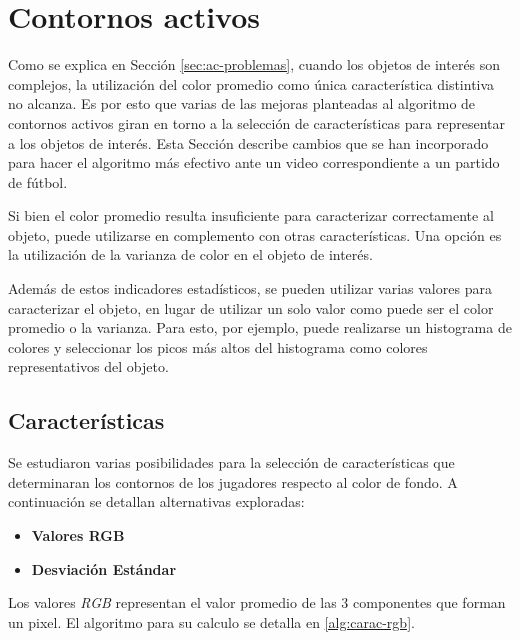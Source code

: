 \section{Contornos activos}
\label{sec:ac-extension}

Como se explica en Sección \ref{sec:ac-problemas}, cuando los objetos de
interés son complejos, la utilización del color promedio como única
característica distintiva no alcanza. Es por esto que varias de las mejoras
planteadas al algoritmo de contornos activos giran en torno a la selección de
características para representar a los objetos de interés. Esta Sección
describe cambios que se han incorporado para hacer el algoritmo más efectivo
ante un video correspondiente a un partido de fútbol.

Si bien el color promedio resulta insuficiente para caracterizar correctamente
al objeto, puede utilizarse en complemento con otras características. Una opción
es la utilización de la varianza de color en el objeto de interés.

Además de estos indicadores estadísticos, se pueden utilizar varias valores
para caracterizar el objeto, en lugar de utilizar un solo valor como puede ser
el color promedio o la varianza. Para esto, por ejemplo, puede realizarse un
histograma de colores y seleccionar los picos más altos del histograma como
colores representativos del objeto.

\subsection{Características}
\label{sec:caracteristicas}

Se estudiaron varias posibilidades para la selección de características que
determinaran los contornos de los jugadores respecto al color de fondo.
A continuación se detallan alternativas exploradas:
\begin{itemize}
  \item \textbf{Valores RGB}
  \item \textbf{Desviación Estándar}
\end{itemize}

Los valores \textit{RGB} representan el valor promedio de las 3
componentes que forman un pixel. El algoritmo
para su calculo se detalla en \ref{alg:carac-rgb}. 


